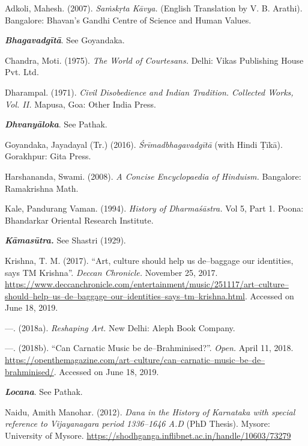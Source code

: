\begin{thebibliography}{99}
\itemsep=0pt
 Adkoli, Mahesh. (2007). \textit{Saṁskṛta Kāvya.} (English Translation by V. B. Arathi). Bangalore: Bhavan’s Gandhi Centre of Science and Human Values.

  \textit{\textbf{Bhagavadgītā}}. See Goyandaka.

  Chandra, Moti. (1975). \textit{The World of Courtesans.} Delhi: Vikas Publishing House Pvt. Ltd.

  Dharampal. (1971). \textit{Civil Disobedience and Indian Tradition. Collected Works, Vol. II.} Mapusa, Goa: Other India Press.

  \textit{\textbf{Dhvanyāloka}}. See Pathak.

  Goyandaka, Jayadayal (Tr.) (2016). \textit{Śrīmadbhagavadgītā} (with Hindi Ṭīkā). Gorakhpur: Gita Press.

  Harshananda, Swami. (2008). \textit{A Concise Encyclopaedia of Hinduism.} Bangalore: Ramakrishna Math.

  Kale, Pandurang Vaman. (1994). \textit{History of Dharmaśāstra.} Vol 5, Part 1. Poona: Bhandarkar Oriental Research Institute.

  \textit{\textbf{Kāmasūtra.}} See Shastri (1929).

  Krishna, T. M. (2017). “Art, culture should help us de–baggage our identities, says TM Krishna”. \textit{Deccan Chronicle.} November 25, 2017. \url{https://www.deccanchronicle.com/entertainment/music/251117/art–culture–should–help–us–de–baggage–our–identities–says–tm–krishna.html}. Accessed on June 18, 2019.

  —. (2018a). \textit{Reshaping Art.} New Delhi: Aleph Book Company.

  —. (2018b). “Can Carnatic Music be de–Brahminised?”. \textit{Open.} April 11, 2018. \url{https://openthemagazine.com/art–culture/can–carnatic–music–be–de–brahminised/}. Accessed on June 18, 2019.

  \textit{\textbf{Locana}}. See Pathak.

  Naidu, Amith Manohar. (2012). \textit{Dana in the History of Karnataka with special reference to Vijayanagara period 1336–1646 A.D} (PhD Thesis). Mysore: University of Mysore. \url{https://shodhganga.inflibnet.ac.in/handle/10603/73279}


\end{thebibliography}
